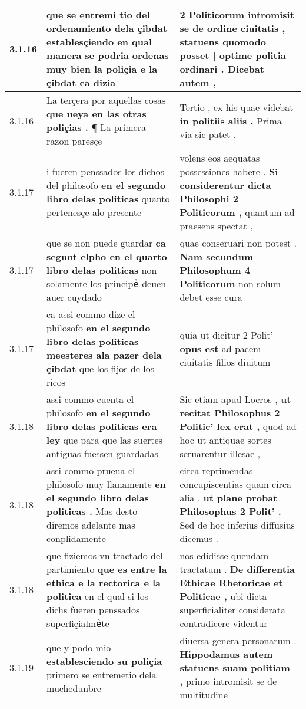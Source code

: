 \begin{tabular}{|p{1cm}|p{6.5cm}|p{6.5cm}|}
3.1.16 & que se entremi tio del ordenamiento dela çibdat \textbf{ establesçiendo en qual manera se podria ordenas muy bien la poliçia e la çibdat } ca dizia & 2 Politicorum intromisit se de ordine ciuitatis , \textbf{ statuens quomodo posset | optime politia ordinari . } Dicebat autem , \\\hline
3.1.16 & La terçera por aquellas cosas \textbf{ que ueya en las otras poliçias . } ¶ La primera razon paresçe & Tertio , ex his quae videbat \textbf{ in politiis aliis . } Prima via sic patet . \\\hline
3.1.17 & i fueren penssados los dichos del philosofo \textbf{ en el segundo libro delas politicas } quanto pertenesçe alo presente & volens eos aequatas possessiones habere . \textbf{ Si considerentur dicta Philosophi 2 Politicorum , } quantum ad praesens spectat , \\\hline
3.1.17 & que se non puede guardar \textbf{ ca segunt elpho en el quarto libro delas politicas } non solamente los principeᷤ deuen auer cuydado & quae conseruari non potest . \textbf{ Nam secundum Philosophum 4 Politicorum } non solum debet esse cura \\\hline
3.1.17 & ca assi commo dize el philosofo \textbf{ en el segundo libro delas politicas meesteres ala pazer dela çibdat } que los fijos de los ricos & quia ut dicitur 2 Polit’ \textbf{ opus est } ad pacem ciuitatis filios diuitum \\\hline
3.1.18 & assi commo cuenta el philosofo \textbf{ en el segundo libro delas politicas era ley } que para que las suertes antiguas fuessen guardadas & Sic etiam apud Locros , \textbf{ ut recitat Philosophus 2 Politic’ lex erat , } quod ad hoc ut antiquae sortes seruarentur illesae , \\\hline
3.1.18 & assi commo prueua el philosofo muy llanamente \textbf{ en el segundo libro delas politicas . } Mas desto diremos adelante mas conplidamente & circa reprimendas concupiscentias quam circa alia , \textbf{ ut plane probat Philosophus 2 Polit’ . } Sed de hoc inferius diffusius dicemus . \\\hline
3.1.18 & que fiziemos vn tractado del partimiento \textbf{ que es entre la ethica e la rectorica e la politica } en el qual si los dichs fueren penssados superfiçialmeᷤte & nos edidisse quendam tractatum . \textbf{ De differentia Ethicae Rhetoricae et Politicae , } ubi dicta superficialiter considerata contradicere videntur \\\hline
3.1.19 & que y podo mio \textbf{ establesciendo su poliçia } primero se entremetio dela muchedunbre & diuersa genera personarum . \textbf{ Hippodamus autem statuens suam politiam , } primo intromisit se de multitudine \\\hline

\end{tabular}
